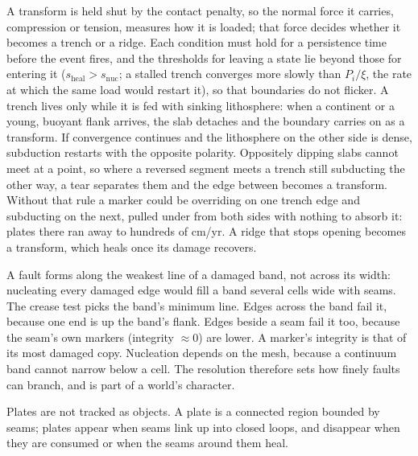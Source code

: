 \documentclass[11pt]{article}
\begin{document}
A transform is held shut by the contact penalty, so the normal force it carries, compression or tension, measures how it is loaded; that force decides whether it becomes a trench or a ridge. Each condition must hold for a persistence time before the event fires, and the thresholds for leaving a state lie beyond those for entering it ($s_{\mathrm{heal}}>s_{\mathrm{nuc}}$; a stalled trench converges more slowly than $P_i/\xi$, the rate at which the same load would restart it), so that boundaries do not flicker. A trench lives only while it is fed with sinking lithosphere: when a continent or a young, buoyant flank arrives, the slab detaches and the boundary carries on as a transform. If convergence continues and the lithosphere on the other side is dense, subduction restarts with the opposite polarity. Oppositely dipping slabs cannot meet at a point, so where a reversed segment meets a trench still subducting the other way, a tear separates them and the edge between becomes a transform. Without that rule a marker could be overriding on one trench edge and subducting on the next, pulled under from both sides with nothing to absorb it: plates there ran away to hundreds of cm/yr. A ridge that stops opening becomes a transform, which heals once its damage recovers.

A fault forms along the weakest line of a damaged band, not across its width: nucleating every damaged edge would fill a band several cells wide with seams. The crease test picks the band's minimum line. Edges across the band fail it, because one end is up the band's flank. Edges beside a seam fail it too, because the seam's own markers (integrity $\approx0$) are lower. A marker's integrity is that of its most damaged copy. Nucleation depends on the mesh, because a continuum band cannot narrow below a cell. The resolution therefore sets how finely faults can branch, and is part of a world's character.

Plates are not tracked as objects. A plate is a connected region bounded by seams; plates appear when seams link up into closed loops, and disappear when they are consumed or when the seams around them heal.
\end{document}
